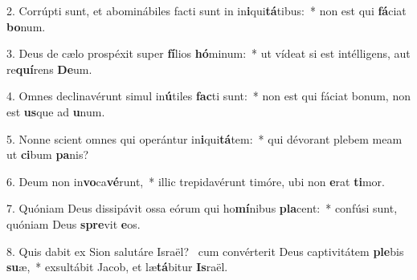 2. Corrúpti sunt, et abominábiles facti sunt in in\textbf{i}qui\textbf{tá}tibus:~*  non est qui \textbf{fá}ciat \textbf{bo}num.\

3. Deus de cælo prospéxit super \textbf{fí}lios \textbf{hó}minum:~*  ut vídeat si est intélligens, aut re\textbf{quí}rens \textbf{De}um.\

4. Omnes declinavérunt simul in\textbf{ú}tiles \textbf{fac}ti sunt:~*  non est qui fáciat bonum, non est \textbf{us}que ad \textbf{u}num.\

5. Nonne scient omnes qui operántur in\textbf{i}qui\textbf{tá}tem:~*  qui dévorant plebem meam ut \textbf{ci}bum \textbf{pa}nis?\

6. Deum non in\textbf{vo}ca\textbf{vé}runt,~*  illic trepidavérunt timóre, ubi non \textbf{e}rat \textbf{ti}mor.\

7. Quóniam Deus dissipávit ossa eórum qui ho\textbf{mí}nibus \textbf{pla}cent:~*  confúsi sunt, quóniam Deus \textbf{spre}vit \textbf{e}os.\

8. Quis dabit ex Sion salutáre Israël? \dag\  cum convérterit Deus captivitátem \textbf{ple}bis \textbf{su}æ,~*  exsultábit Jacob, et læ\textbf{tá}bitur \textbf{Is}raël.\

